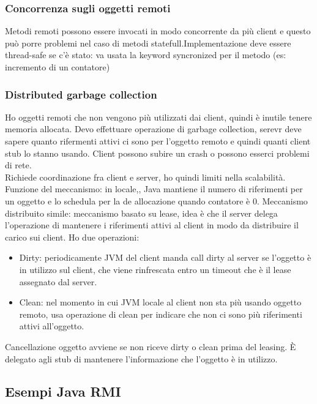 \documentclass{article}
\begin{document}
\subsubsection{Concorrenza sugli oggetti remoti}
Metodi remoti possono essere invocati in modo concorrente da più client e questo può porre problemi nel caso di metodi statefull.Implementazione deve essere thread-safe se c'è stato: va usata la keyword syncronized per il metodo (es: incremento di un contatore)
\subsubsection{Distributed garbage collection}
Ho oggetti remoti che non vengono più utilizzati dai client, quindi è inutile tenere memoria allocata. Devo effettuare operazione di garbage collection, serevr deve sapere quanto rifermenti attivi ci sono per l'oggetto remoto e quindi quanti client stub lo stanno usando. Client possono subire un crash o possono esserci problemi di rete.\\ Richiede coordinazione fra client e server, ho quindi limiti nella scalabilità. Funzione del meccanismo: in locale,, Java mantiene il numero di riferimenti per un oggetto e lo schedula per la de allocazione quando contatore è 0. Meccanismo distribuito simile: meccanismo basato su lease, idea è che il server delega l'operazione di mantenere i riferimenti attivi al client in modo da distribuire il carico sui client. Ho due operazioni:
\begin{itemize}
\item Dirty: periodicamente JVM del client manda call dirty al server se l'oggetto è in utilizzo sul client, che viene rinfrescata entro un timeout che è il lease assegnato dal server.
\item Clean: nel momento in cui JVM locale al client non sta più usando oggetto remoto, usa operazione di clean per indicare che non ci sono più riferimenti attivi all'oggetto.
\end{itemize}
Cancellazione oggetto avviene se non riceve dirty o clean prima del leasing. È delegato agli stub di mantenere l'informazione che l'oggetto è in utilizzo.\\ 
\subsection{Esempi Java RMI}
\end{document}
